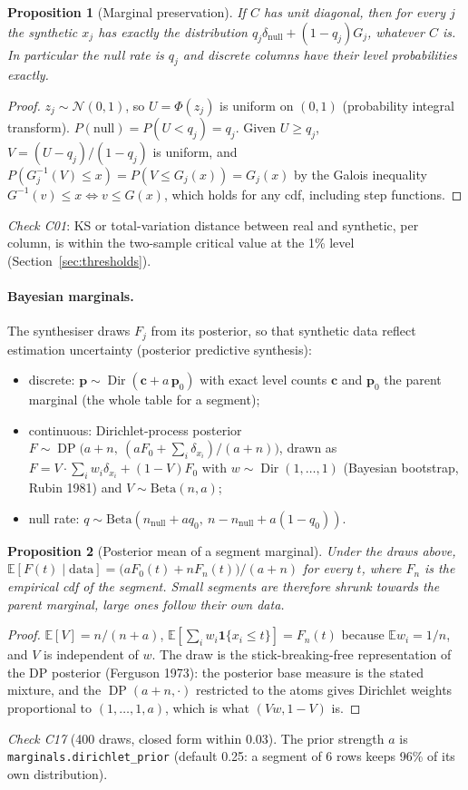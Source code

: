 \documentclass[11pt,a4paper]{article}
\newtheorem{proposition}{Proposition}
\theoremstyle{definition}
\theoremstyle{remark}
\newcommand{\E}{\mathbb{E}}
\newcommand{\Dir}{\operatorname{Dir}}
\newcommand{\DP}{\operatorname{DP}}
\begin{document}
\begin{proposition}[Marginal preservation]\label{prop:pit}
If $C$ has unit diagonal, then for every $j$ the synthetic $x_j$ has exactly the distribution $q_j\delta_{\text{null}}+(1-q_j)G_j$, whatever $C$ is. In particular the null rate is $q_j$ and discrete columns have their level probabilities exactly.
\end{proposition}
\begin{proof}
$z_j\sim\mathcal N(0,1)$, so $U=\Phi(z_j)$ is uniform on $(0,1)$ (probability integral transform). $P(\text{null})=P(U<q_j)=q_j$. Given $U\ge q_j$, $V=(U-q_j)/(1-q_j)$ is uniform, and $P(G_j^{-1}(V)\le x)=P(V\le G_j(x))=G_j(x)$ by the Galois inequality $G^{-1}(v)\le x\iff v\le G(x)$, which holds for any cdf, including step functions.
\end{proof}
\noindent\emph{Check C01}: KS or total-variation distance between real and synthetic, per column, is within the two-sample critical value at the 1\% level (Section~\ref{sec:thresholds}).

\paragraph{Bayesian marginals.} The synthesiser draws $F_j$ from its posterior, so that synthetic data reflect estimation uncertainty (posterior predictive synthesis):
\begin{itemize}
\item discrete: $\mathbf p\sim\Dir(\mathbf c+a\,\mathbf p_0)$ with exact level counts $\mathbf c$ and $\mathbf p_0$ the parent marginal (the whole table for a segment);
\item continuous: Dirichlet-process posterior $F\sim\DP\big(a+n,\ (aF_0+\sum_i\delta_{x_i})/(a+n)\big)$, drawn as $F=V\cdot\sum_iw_i\delta_{x_i}+(1-V)F_0$ with $w\sim\Dir(1,\dots,1)$ (Bayesian bootstrap, Rubin 1981) and $V\sim\mathrm{Beta}(n,a)$;
\item null rate: $q\sim\mathrm{Beta}(n_\text{null}+a q_0,\ n-n_\text{null}+a(1-q_0))$.
\end{itemize}

\begin{proposition}[Posterior mean of a segment marginal]\label{prop:dp}
Under the draws above, $\E[F(t)\mid\text{data}]=\big(aF_0(t)+nF_n(t)\big)/(a+n)$ for every $t$, where $F_n$ is the empirical cdf of the segment. Small segments are therefore shrunk towards the parent marginal, large ones follow their own data.
\end{proposition}
\begin{proof}
$\E[V]=n/(n+a)$, $\E[\sum_iw_i\mathbf 1\{x_i\le t\}]=F_n(t)$ because $\E w_i=1/n$, and $V$ is independent of $w$. The draw is the stick-breaking-free representation of the DP posterior (Ferguson 1973): the posterior base measure is the stated mixture, and the $\DP(a+n,\cdot)$ restricted to the atoms gives Dirichlet weights proportional to $(1,\dots,1,a)$, which is what $(Vw,1-V)$ is.
\end{proof}
{\sloppy\noindent\emph{Check C17} (400 draws, closed form within 0.03). The prior strength $a$ is \texttt{marginals.dirichlet\_prior} (default 0.25: a segment of 6 rows keeps 96\% of its own distribution).\par}
\end{document}
